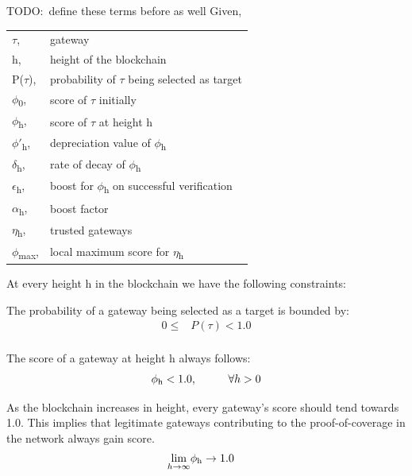 \documentclass[letterpaper,11pt]{article}
\newcommand{\todo}[1]{}
\renewcommand{\todo}[1]{{\color{red} TODO:\ {#1}}}
\begin{document}
\todo{define these terms before as well}\newline
Given,\newline
\begin{tabular}{l l}
	$\tau$, &gateway \\
	h, &height of the blockchain \\
	P($\tau$), &probability of $\tau$ being selected as target\\
	$\phi$\textsubscript{0}, &score of $\tau$ initially\\
	$\phi$\textsubscript{h}, &score of $\tau$ at height h\\
	$\phi'$\textsubscript{h}, &depreciation value of $\phi$\textsubscript{h}\\
	$\delta$\textsubscript{h}, &rate of decay of $\phi$\textsubscript{h}\\
	$\epsilon$\textsubscript{h}, &boost for $\phi$\textsubscript{h} on successful verification\\
	$\alpha$\textsubscript{h}, &boost factor\\
	$\eta$\textsubscript{h}, &trusted gateways\\
	$\phi$\textsubscript{max}, &local maximum score for $\eta$\textsubscript{h}
\end{tabular}

At every height h in the blockchain we have the following constraints:

The probability of a gateway being selected as a target is bounded by:
\begin{equation*} \label{constraint1}
\begin{split}
0 \leq &P(\tau) < 1.0 \\
\end{split}
\end{equation*}

The score of a gateway at height h always follows:
\begin{equation*} \label{constraint2}
\begin{split}
\phi\textsubscript{h} < 1.0, \hspace{1cm} \forall h > 0
\end{split}
\end{equation*}

As the blockchain increases in height, every gateway's score should tend towards 1.0. This implies that legitimate gateways contributing to the proof-of-coverage in the network always gain score.
\begin{equation*} \label{goal}
\begin{split}
\lim_{h \to \infty} & \phi\textsubscript{h} \rightarrow 1.0
\end{split}
\end{equation*}
\end{document}
